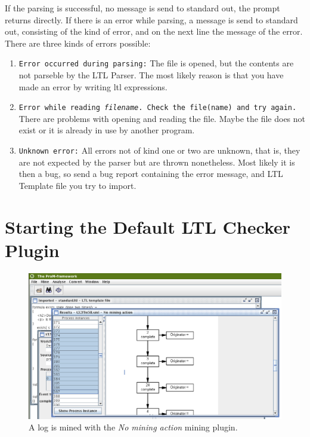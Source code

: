 If the parsing is successful, no message is send to standard out, the prompt
returns directly. If there is an error while parsing, a message is send to standard
out, consisting of the kind of error, and on the next line the message of
the error. There are three kinds of errors possible:
\begin{enumerate}
    \item \texttt{Error occurred during parsing:} The file is opened, but the
    contents are not parseble by the LTL Parser. The most likely reason is
    that you have made an error by writing ltl expressions.
    \item \texttt{Error while reading \textit{filename}. Check the file(name)
    and try again.} There are problems with opening and reading the file.
    Maybe the file does not exist or it is already in use by another program.
    \item \texttt{Unknown error:} All errors not of kind one or two are
    unknown, that is, they are not expected by the parser but are thrown
    nonetheless. Most likely it is then a bug, so send a bug report containing
    the error message, and LTL Template file you try to import.
\end{enumerate}

\section{Starting the Default LTL Checker Plugin}
\label{plugingui:default}

\begin{figure}[H]
    \includegraphics[scale=0.4]{images/framework-log-and-ltl-cutted.eps}
    \caption{A log is mined with the \textit{No mining action} mining plugin.}
    \label{plugingui:log}
\end{figure}

